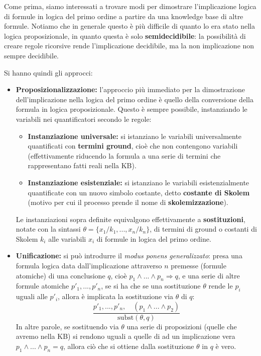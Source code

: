 \documentclass[a4paper,11pt]{article}
\begin{document}
Come prima, siamo interessati a trovare modi per dimostrare l'implicazione logica di formule in logica del primo ordine a partire da una knowledge base di altre formule.
Notiamo che in generale questo è più difficile di quanto lo era stato nella logica proposizionale, in quanto questa è solo \textbf{semidecidibile}: la possibilità di creare regole ricorsive rende l'implicazione decidibile, ma la non implicazione non sempre decidibile.

Si hanno quindi gli approcci:
\begin{itemize}
	\item \textbf{Proposizionalizzazione:}
		l'approccio più immediato per la dimostrazione dell'implicazione nella logica del primo ordine è quello della conversione della formula in logica proposizionale. Questo è sempre possibile, instanziando le variabili nei quantificatori secondo le regole:
		\begin{itemize}
			\item \textbf{Instanziazione universale:} si istanziano le variabili universalmente quantificati con \textbf{termini ground}, cioè che non contengono variabili (effettivamente riducendo la formula a una serie di termini che rappresentano fatti reali nella KB).
			\item \textbf{Instanziazione esistenziale:} si istanziano le variabili esistenzialmente quantificate con un nuovo simbolo costante, detto \textbf{costante di Skolem} (motivo per cui il processo prende il nome di \textbf{skolemizzazione}).
		\end{itemize}
		Le instanziazioni sopra definite equivalgono effettivamente a \textbf{sostituzioni}, notate con la sintassi $\theta = \{ x_1 / k_1, ..., x_n / k_n \}$, di termini di ground o costanti di Skolem $k_i$ alle variabili $x_i$ di formule in logica del primo ordine.
	\item \textbf{Unificazione:}
		si può introdurre il \textit{modus ponens generalizzato}: presa una formula logica data dall'implicazione attraverso $n$ premesse (formule atomiche) di una conclusione $q$, cioè $p_1 \wedge ... \wedge p_n \Rightarrow q$, e una serie di altre formule atomiche $p'_1, ..., p'_n$, se si ha che se una sostituzione $\theta$ rende le $p_i$ uguali alle $p'_i$, allora è implicata la sostituzione via $\theta$ di $q$:
$$
\frac{p'_1, ..., p'_n, \quad (p_1 \wedge ... \wedge p_2)}{\mathrm{subst}(\theta, q)}
$$
In altre parole, se sostituendo via $\theta$ una serie di proposizioni (quelle che avremo nella KB) si rendono uguali a quelle di ad un implicazione vera $p_1 \wedge ... \wedge p_n = q$, allora ciò che si ottiene dalla sostituzione $\theta$ in $q$ è vero.

\end{itemize}
\end{document}
